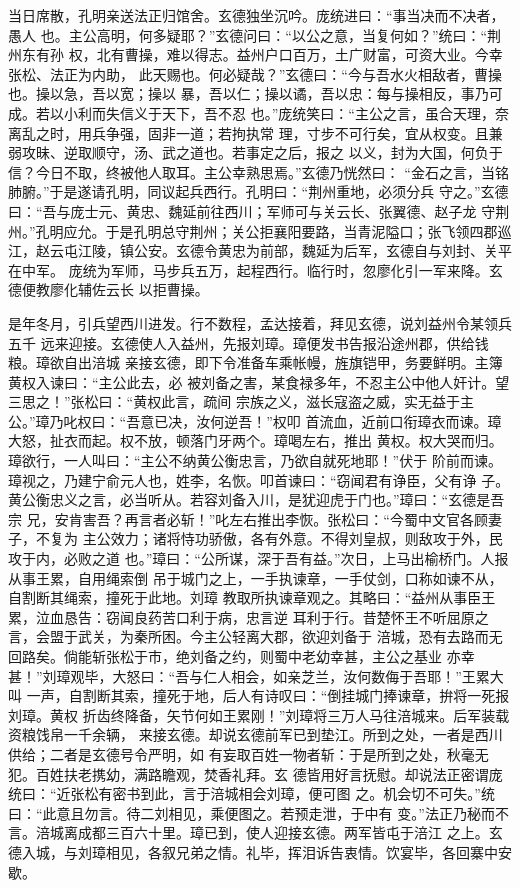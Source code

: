 当日席散，孔明亲送法正归馆舍。玄德独坐沉吟。庞统进曰：“事当决而不决者，愚人
也。主公高明，何多疑耶？”玄德问曰：“以公之意，当复何如？”统曰：“荆州东有孙
权，北有曹操，难以得志。益州户口百万，土广财富，可资大业。今幸张松、法正为内助，
此天赐也。何必疑哉？”玄德曰：“今与吾水火相敌者，曹操也。操以急，吾以宽；操以
暴，吾以仁；操以谲，吾以忠：每与操相反，事乃可成。若以小利而失信义于天下，吾不忍
也。”庞统笑曰：“主公之言，虽合天理，奈离乱之时，用兵争强，固非一道；若拘执常
理，寸步不可行矣，宜从权变。且兼弱攻昧、逆取顺守，汤、武之道也。若事定之后，报之
以义，封为大国，何负于信？今日不取，终被他人取耳。主公幸熟思焉。”玄德乃恍然曰：
“金石之言，当铭肺腑。”于是遂请孔明，同议起兵西行。孔明曰：“荆州重地，必须分兵
守之。”玄德曰：“吾与庞士元、黄忠、魏延前往西川；军师可与关云长、张翼德、赵子龙
守荆州。”孔明应允。于是孔明总守荆州；关公拒襄阳要路，当青泥隘口；张飞领四郡巡
江，赵云屯江陵，镇公安。玄德令黄忠为前部，魏延为后军，玄德自与刘封、关平在中军。
庞统为军师，马步兵五万，起程西行。临行时，忽廖化引一军来降。玄德便教廖化辅佐云长
以拒曹操。

是年冬月，引兵望西川进发。行不数程，孟达接着，拜见玄德，说刘益州令某领兵五千
远来迎接。玄德使人入益州，先报刘璋。璋便发书告报沿途州郡，供给钱粮。璋欲自出涪城
亲接玄德，即下令准备车乘帐幔，旌旗铠甲，务要鲜明。主簿黄权入谏曰：“主公此去，必
被刘备之害，某食禄多年，不忍主公中他人奸计。望三思之！”张松曰：“黄权此言，疏间
宗族之义，滋长寇盗之威，实无益于主公。”璋乃叱权曰：“吾意已决，汝何逆吾！”权叩
首流血，近前口衔璋衣而谏。璋大怒，扯衣而起。权不放，顿落门牙两个。璋喝左右，推出
黄权。权大哭而归。璋欲行，一人叫曰：“主公不纳黄公衡忠言，乃欲自就死地耶！”伏于
阶前而谏。璋视之，乃建宁俞元人也，姓李，名恢。叩首谏曰：“窃闻君有诤臣，父有诤
子。黄公衡忠义之言，必当听从。若容刘备入川，是犹迎虎于门也。”璋曰：“玄德是吾宗
兄，安肯害吾？再言者必斩！”叱左右推出李恢。张松曰：“今蜀中文官各顾妻子，不复为
主公效力；诸将恃功骄傲，各有外意。不得刘皇叔，则敌攻于外，民攻于内，必败之道
也。”璋曰：“公所谋，深于吾有益。”次日，上马出榆桥门。人报从事王累，自用绳索倒
吊于城门之上，一手执谏章，一手仗剑，口称如谏不从，自割断其绳索，撞死于此地。刘璋
教取所执谏章观之。其略曰：“益州从事臣王累，泣血恳告：窃闻良药苦口利于病，忠言逆
耳利于行。昔楚怀王不听屈原之言，会盟于武关，为秦所困。今主公轻离大郡，欲迎刘备于
涪城，恐有去路而无回路矣。倘能斩张松于市，绝刘备之约，则蜀中老幼幸甚，主公之基业
亦幸甚！”刘璋观毕，大怒曰：“吾与仁人相会，如亲芝兰，汝何数侮于吾耶！”王累大叫
一声，自割断其索，撞死于地，后人有诗叹曰：“倒挂城门捧谏章，拚将一死报刘璋。黄权
折齿终降备，矢节何如王累刚！”刘璋将三万人马往涪城来。后军装载资粮饯帛一千余辆，
来接玄德。却说玄德前军已到垫江。所到之处，一者是西川供给；二者是玄德号令严明，如
有妄取百姓一物者斩：于是所到之处，秋毫无犯。百姓扶老携幼，满路瞻观，焚香礼拜。玄
德皆用好言抚慰。却说法正密谓庞统曰：“近张松有密书到此，言于涪城相会刘璋，便可图
之。机会切不可失。”统曰：“此意且勿言。待二刘相见，乘便图之。若预走泄，于中有
变。”法正乃秘而不言。涪城离成都三百六十里。璋已到，使人迎接玄德。两军皆屯于涪江
之上。玄德入城，与刘璋相见，各叙兄弟之情。礼毕，挥泪诉告衷情。饮宴毕，各回寨中安
歇。

